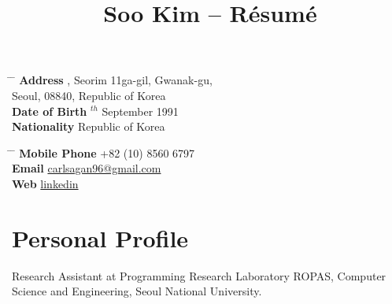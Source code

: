 \documentclass[10pt]{article} %
\begin{document}

\title{Soo Kim -- Résumé} %


\parbox{0.5\textwidth}{ %
\begin{tabbing} %
\hspace{3cm} \= \hspace{4cm} \= \kill %
{\bf Address} , Seorim 11ga-gil, Gwanak-gu,\\ %
\> Seoul, 08840, Republic of Korea \\ %
{\bf Date of Birth} $^{th}$ September 1991 \\ %
{\bf Nationality} \> Republic of Korea %
\end{tabbing}}
\hfill %
\parbox{0.5\textwidth}{ %
\begin{tabbing} %
\hspace{3cm} \= \hspace{4cm} \= \kill %
{\bf Mobile Phone} \> +82 (10) 8560 6797 \\ %
{\bf Email} \> \href{mailto:carlsagan96@gmail.com}{carlsagan96@gmail.com} \\ %
{\bf Web} \> \href{https://www.linkedin.com/in/soo-kim-carlsagan96/}{linkedin} \\ %
\end{tabbing}}


\section{Personal Profile}

Research Assistant at Programming Research Laboratory ROPAS, Computer Science and Engineering, Seoul National University.
\end{document}
